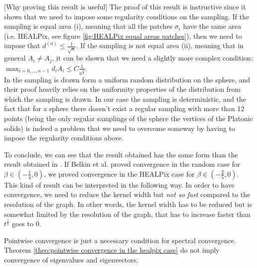 [Why proving this result is useful] The proof of this result is instructive since it shows that we need to impose some regularity conditions on the sampling. If the sampling is equal area (i), meaning that all the patches $\sigma_i$ have the same area (i.e. HEALPix, see figure \ref{fig:HEALPix equal areas patches}), then we need to impose that $ d^{(n)}\leq \frac{1}{\sqrt{n}}$. If the sampling is not equal area (ii), meaning that in general $A_i\neq A_j$, it can be shown that we need a slightly more complex condition: $\max_{i=0,...,n-1}d_iA_i\leq C\frac{1}{n^\frac{3}{2}}$.\\
In \cite{Belkin:2005:TTF:2138147.2138189} the sampling is drawn form a uniform random distribution on the sphere, and their proof heavily relies on the uniformity properties of the distribution from which the sampling is drawn. In our case the sampling is deterministic, and the fact that for a sphere there doesn't exist a regular sampling with more than 12 points (being the only regular samplings of the sphere the vertices of the Platonic solids) is indeed a problem that we need to overcome someway by having to impose the regularity conditions above. 


To conclude, we can see that the result obtained has the same form than the result obtained in \cite{Belkin:2005:TTF:2138147.2138189}. If Belkin et al. proved convergence in the random case for $\beta \in (-\frac{1}{4}, 0)$, we proved convergence in the HEALPix case for $\beta \in (-\frac{2}{5}, 0)$. This kind of result can be interpreted in the following way. In order to have convergence, we need to reduce the kernel width but \textit{not so fast} compared to the resolution of the graph. In other words, the kernel width has to be reduced but is somewhat limited by the resolution of the graph, that has to increase faster than $t^\frac{2}{5}$ goes to $0$.\\
\begin{remark}
	Pointwise convergence is just a necessary condition for spectral convergence.  Theorem \ref{theo:pointwise convergence in the healpix case} do not imply convergence of eigenvalues and eigenvectors.
\end{remark}

\clearpage
